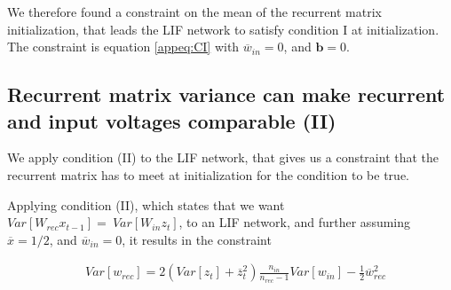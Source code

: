 We therefore found a constraint on the mean of the recurrent matrix initialization, that leads the LIF network to satisfy condition I at initialization. The constraint is equation \ref{appeq:CI} with $\overline{w}_{in}=0$, and  $\boldsymbol{b}=0$.


\subsection{Recurrent matrix variance can  make recurrent and input voltages comparable (II)}
\label{app:ineqrec}

We apply condition (II) to the LIF network, that gives us a constraint that the recurrent matrix has to meet at initialization for the condition to be true.

\begin{lemma}\label{thm:cII}
Applying condition (II), which states that we want $Var[W_{rec}x_{t-1}] =  \ Var[W_{in}z_t]$, to an LIF network, and further assuming $\overline{x}=1/2$, and $\overline{w}_{in}=0$, it results in the constraint


\begin{align}\label{eq:condition_II}
    &Var[w_{rec}]  =  2(Var[z_t] + \overline{z}_t^2)\frac{n_{in}}{n_{rec}-1}Var[w_{in}] - \frac{1}{2}\overline{w}_{rec}^2
\end{align}
\end{lemma}

